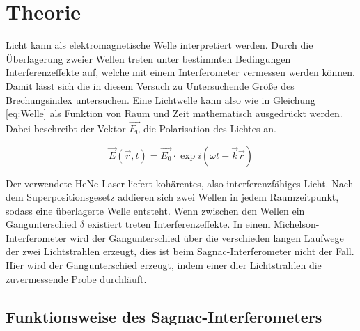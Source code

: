 \section{Theorie}
\label{sec:Theorie}
Licht kann als elektromagnetische Welle interpretiert werden. Durch die Überlagerung
zweier Wellen treten unter bestimmten Bedingungen Interferenzeffekte auf, welche mit
einem Interferometer vermessen werden können. Damit lässt sich die in diesem Versuch
zu Untersuchende Größe des Brechungsindex untersuchen.
Eine Lichtwelle kann also wie in Gleichung \ref{eq:Welle} als Funktion von Raum und Zeit
mathematisch ausgedrückt werden. Dabei beschreibt der Vektor $\vec{E_0}$ die Polarisation des Lichtes an.

\begin{equation}
	\vec{E}(\vec{r},t) = \vec{E_0}\cdot \exp i(\omega t - \vec{k}\vec{r})
\label{eq:Welle}
\end{equation}

Der verwendete HeNe-Laser liefert kohärentes, also interferenzfähiges Licht.
Nach dem Superpositionsgesetz addieren sich zwei Wellen in jedem Raumzeitpunkt,
sodass eine überlagerte Welle entsteht. Wenn zwischen den Wellen ein Gangunterschied
$\delta$ existiert treten Interferenzeffekte. In einem Michelson-Interferometer wird der
Gangunterschied über die verschieden langen Laufwege der zwei Lichtstrahlen erzeugt, dies ist
beim Sagnac-Interferometer nicht der Fall. Hier wird der Gangunterschied erzeugt, indem
einer dier Lichtstrahlen die zuvermessende Probe durchläuft.  

\subsection{Funktionsweise des Sagnac-Interferometers}
